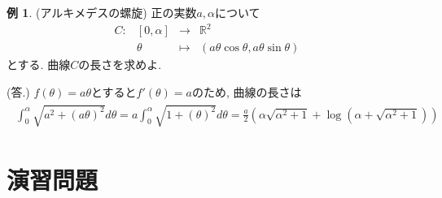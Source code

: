 \documentclass[dvipdfmx,a4paper,11pt]{article}
\newcommand{\R}{\mathbb{R}}
\newcommand{\N}{\mathbb{N}}
\theoremstyle{definition}
\newtheorem{exa}[thm]{例}
\begin{document}
 \begin{exa}
(アルキメデスの螺旋)
正の実数$a , \alpha $について
$$
\begin{array}{ccccc}
C: &[0,\alpha] & \rightarrow & \R^2 & \\
&\theta & \longmapsto &(a \theta \cos \theta ,  a \theta \sin \theta)&
\end{array}
$$
 とする. 曲線$C$の長さを求めよ.
 
\hspace{-18pt} (答.) $f(\theta) = a \theta$とすると$f'(\theta) = a$のため, 曲線の長さは\begin{align*}
\begin{split}
\int_{0}^{\alpha} \sqrt{a^2 + (a \theta)^2} d\theta = 
a \int_{0}^{\alpha} \sqrt{1+ (\theta)^2} d\theta = 
\frac{a}{2}\left(\alpha\sqrt{\alpha^2 + 1} + \log (\alpha + \sqrt{\alpha^2 + 1})\right)
\end{split}
\end{align*}
 \end{exa}


\newpage
\section{演習問題} 

\end{document}

